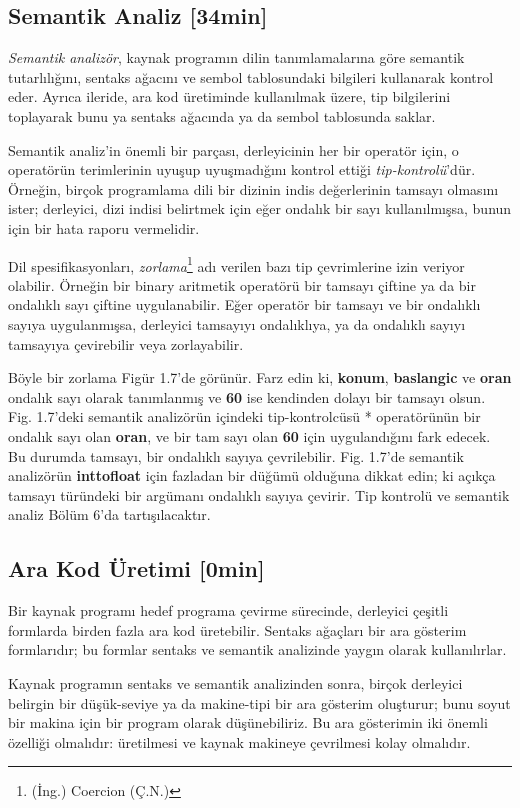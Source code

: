 \documentclass{book}
\begin{document}
\subsection{Semantik Analiz [34min]}
\textit{Semantik analizör}, kaynak programın dilin tanımlamalarına göre semantik tutarlılığını, sentaks ağacını ve sembol tablosundaki bilgileri kullanarak kontrol eder. Ayrıca ileride, ara kod üretiminde kullanılmak üzere, tip bilgilerini toplayarak bunu ya sentaks ağacında ya da sembol tablosunda saklar.

Semantik analiz'in önemli bir parçası, derleyicinin her bir operatör için, o operatörün terimlerinin uyuşup uyuşmadığını kontrol ettiği \textit{tip-kontrolü}'dür. Örneğin, birçok programlama dili bir dizinin indis değerlerinin tamsayı olmasını ister; derleyici, dizi indisi belirtmek için eğer ondalık bir sayı kullanılmışsa, bunun için bir hata raporu vermelidir.

Dil spesifikasyonları, \textit{zorlama}\footnote{(İng.) Coercion (Ç.N.)} adı verilen bazı tip çevrimlerine izin veriyor olabilir. Örneğin bir binary aritmetik operatörü bir tamsayı çiftine ya da bir ondalıklı sayı çiftine uygulanabilir. Eğer operatör bir tamsayı ve bir ondalıklı sayıya uygulanmışsa, derleyici tamsayıyı ondalıklıya, ya da ondalıklı sayıyı tamsayıya çevirebilir veya zorlayabilir.

Böyle bir zorlama Figür 1.7'de görünür. Farz edin ki, \textbf{konum}, \textbf{baslangic} ve \textbf{oran} ondalık sayı olarak tanımlanmış ve \textbf{60} ise kendinden dolayı bir tamsayı olsun. Fig. 1.7'deki semantik analizörün içindeki tip-kontrolcüsü * operatörünün bir ondalık sayı olan \textbf{oran}, ve bir tam sayı olan \textbf{60} için uygulandığını fark edecek. Bu durumda tamsayı, bir ondalıklı sayıya çevrilebilir. Fig. 1.7'de semantik analizörün \textbf{inttofloat} için fazladan bir düğümü olduğuna dikkat edin; ki açıkça tamsayı türündeki bir argümanı ondalıklı sayıya çevirir. Tip kontrolü ve semantik analiz Bölüm 6'da tartışılacaktır.

\subsection{Ara Kod Üretimi [0min]}
Bir kaynak programı hedef programa çevirme sürecinde, derleyici çeşitli formlarda birden fazla ara kod üretebilir. Sentaks ağaçları bir ara gösterim formlarıdır; bu formlar sentaks ve semantik analizinde yaygın olarak kullanılırlar.

Kaynak programın sentaks ve semantik analizinden sonra, birçok derleyici belirgin bir düşük-seviye ya da makine-tipi bir ara gösterim oluşturur; bunu soyut bir makina için bir program olarak düşünebiliriz. Bu ara gösterimin iki önemli özelliği olmalıdır: üretilmesi ve kaynak makineye çevrilmesi kolay olmalıdır.
\end{document}
